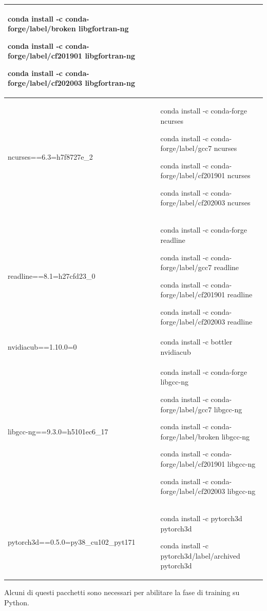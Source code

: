 \begin{table}
\begin{tabular}{ |p{8cm}||p{8cm}|}
	conda install -c conda-forge/label/broken libgfortran-ng

	conda install -c conda-forge/label/cf201901 libgfortran-ng

	conda install -c conda-forge/label/cf202003 libgfortran-ng\\ \hline



ncurses==6.3=h7f8727e\_2  &
	conda install -c conda-forge ncurses

	conda install -c conda-forge/label/gcc7 ncurses

	conda install -c conda-forge/label/cf201901 ncurses

	conda install -c conda-forge/label/cf202003 ncurses\\ \hline



  readline==8.1=h27cfd23\_0 &
	conda install -c conda-forge readline

	conda install -c conda-forge/label/gcc7 readline

	conda install -c conda-forge/label/cf201901 readline

	conda install -c conda-forge/label/cf202003 readline\\ \hline


  
  nvidiacub==1.10.0=0 &	conda install -c bottler nvidiacub\\ \hline



  libgcc-ng==9.3.0=h5101ec6\_17  &
	conda install -c conda-forge libgcc-ng

	conda install -c conda-forge/label/gcc7 libgcc-ng

	conda install -c conda-forge/label/broken libgcc-ng

	conda install -c conda-forge/label/cf201901 libgcc-ng

	conda install -c conda-forge/label/cf202003 libgcc-ng\\ \hline



  pytorch3d==0.5.0=py38\_cu102\_pyt171  &
	conda install -c pytorch3d pytorch3d

	conda install -c pytorch3d/label/archived pytorch3d\\



\end{tabular}
\end{table}
\medskip

Alcuni di questi pacchetti sono necessari per abilitare la fase di training su Python.
























